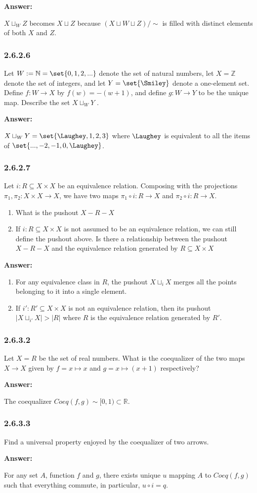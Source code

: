 \documentclass{article}
\newcommand{\N}{\mathbb{N}}
\newcommand{\Rat}{\mathbb{R}}
\newcommand{\vsp}[0]{\vspace*{10pt}\par}
\newcommand{\exercise}[1]{\subsubsection*{#1}}
\newcommand{\ans}[0]{\vsp\textbf{Answer: }\vsp}
\newcommand{\ei}{\item}
\newcommand{\eb}{\begin{enumerate}[label=(\alph*)]\ei}
\newcommand{\ee}{\end{enumerate}}
\begin{document}
\ans

$X \sqcup_W Z$ becomes $X \sqcup Z$ because $(X \sqcup W \sqcup Z)/\sim$ is
filled with distinct elements of both $X$ and $Z$.

\exercise{2.6.2.6}

Let $W := \N = \set{0,1,2,... }$ denote the set of natural numbers, let $X =
\mathbb{Z}$ denote the set of integers, and let $Y = \set{\Smiley}$ denote a
one-element set. Define $f : W \to X$ by $f(w) = -(w+1)$, and define $g: W \to Y$ to be
the unique map. Describe the set $X \sqcup_W Y$ .

\ans

$X \sqcup_W Y = \set{\Laughey, 1, 2, 3}$ where $\Laughey$ is equivalent to all
the items of $\set{..., -2, -1, 0, \Laughey}$.

\exercise{2.6.2.7}

Let $i: R \subseteq X \times X$ be an equivalence relation. Composing with the
projections $\pi_1, \pi_2 : X \times X \to X$, we have two maps $\pi_1 \circ i :
R \to X$ and $\pi_2 \circ i: R \to X$.

\eb What is the pushout $X - R - X$
\ei If $i: R \subseteq X \times X$ is not assumed to be an equivalence relation,
    we can still define the pushout above. Is there a relationship between the
    pushout $X - R - X$ and the equivalence relation generated by $R \subseteq X
    \times X$
\ee

\ans

\eb For any equivalence class in $R$, the pushout $X \sqcup_{i} X$ merges all
    the points belonging to it into a single element.
\ei If $i' : R' \subseteq X \times X$ is not an equivalence relation, then its
    pushout $|X \sqcup_{i'} X| > |R|$ where $R$ is the equivalence relation
    generated by $R'$.
\ee

\exercise{2.6.3.2}

Let $X = R$ be the set of real numbers. What is the coequalizer of the two maps
$X \to X$ given by $f = x \mapsto x$ and $g = x \mapsto (x + 1)$ respectively?

\ans

The coequalizer $Coeq(f,g) \sim [0,1) \subset \Rat$.

\exercise{2.6.3.3}

Find a universal property enjoyed by the coequalizer of two arrows.

\ans

For any set $A$, function $f$ and $g$, there exists unique $u$ mapping $A$ to
$Coeq(f,g)$ such that everything commute, in particular, $u \circ i = q$.
\end{document}
